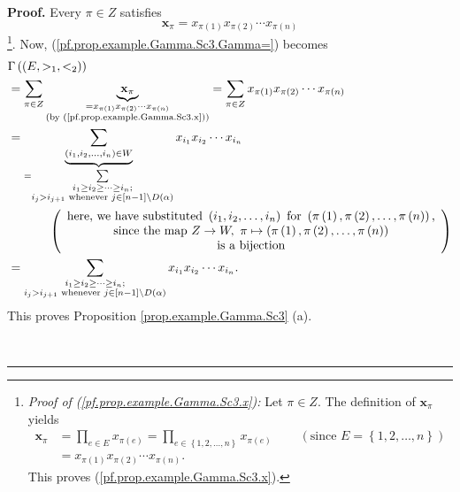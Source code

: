 \documentclass[numbers=enddot,12pt,final,onecolumn,notitlepage,abstracton]{scrartcl}
\theoremstyle{definition}
\newenvironment{proof}[1][Proof]{\noindent\textbf{#1.} }{\ \rule{0.5em}{0.5em}}
\let\sumnonlimits\sum
\let\prodnonlimits\prod
\renewcommand{\sum}{\sumnonlimits\limits}
\renewcommand{\prod}{\prodnonlimits\limits}
\newenvironment{verlong}{}{}
\begin{document}
\begin{verlong}
\begin{footnotesize}
\begin{proof}
Every $\pi\in Z$ satisfies%
\begin{equation}
\mathbf{x}_{\pi}=x_{\pi\left(  1\right)  }x_{\pi\left(  2\right)  }\cdots
x_{\pi\left(  n\right)  } \label{pf.prop.example.Gamma.Sc3.x}%
\end{equation}
\footnote{\textit{Proof of (\ref{pf.prop.example.Gamma.Sc3.x}):} Let $\pi\in
Z$. The definition of $\mathbf{x}_{\pi}$ yields%
\begin{align*}
{\mathbf{x}}_{\pi}  &  =\prod_{e\in E}x_{\pi\left(  e\right)  }=\prod
_{e\in\left\{  1,2,\ldots,n\right\}  }x_{\pi\left(  e\right)  }%
\ \ \ \ \ \ \ \ \ \ \left(  \text{since }E=\left\{  1,2,\ldots,n\right\}
\right) \\
&  =x_{\pi\left(  1\right)  }x_{\pi\left(  2\right)  }\cdots x_{\pi\left(
n\right)  }.
\end{align*}
This proves (\ref{pf.prop.example.Gamma.Sc3.x}).}. Now,
(\ref{pf.prop.example.Gamma.Sc3.Gamma=}) becomes%
\begin{align*}
&  \Gamma\left(  \left(  E,>_{1},<_{2}\right)  \right) \\
&  =\sum_{\pi\in Z}\underbrace{\mathbf{x}_{\pi}}_{\substack{=x_{\pi\left(
1\right)  }x_{\pi\left(  2\right)  }\cdots x_{\pi\left(  n\right)
}\\\text{(by (\ref{pf.prop.example.Gamma.Sc3.x}))}}}=\sum_{\pi\in Z}%
x_{\pi\left(  1\right)  }x_{\pi\left(  2\right)  }\cdots x_{\pi\left(
n\right)  }\\
&  =\underbrace{\sum_{\left(  i_{1},i_{2},\ldots,i_{n}\right)  \in W}}%
_{=\sum_{\substack{i_{1}\geq i_{2}\geq\cdots\geq i_{n};\\i_{j}>i_{j+1}\text{
whenever }j\in\left[  n-1\right]  \setminus D\left(  \alpha\right)  }%
}}x_{i_{1}}x_{i_{2}}\cdots x_{i_{n}}\\
&  \ \ \ \ \ \ \ \ \ \ \left(
\begin{array}
[c]{c}%
\text{here, we have substituted }\left(  i_{1},i_{2},\ldots,i_{n}\right)
\text{ for }\left(  \pi\left(  1\right)  ,\pi\left(  2\right)  ,\ldots
,\pi\left(  n\right)  \right)  \text{,}\\
\text{since the map }Z\rightarrow W,\ \pi\mapsto\left(  \pi\left(  1\right)
,\pi\left(  2\right)  ,\ldots,\pi\left(  n\right)  \right) \\
\text{is a bijection}%
\end{array}
\right) \\
&  =\sum_{\substack{i_{1}\geq i_{2}\geq\cdots\geq i_{n};\\i_{j}>i_{j+1}\text{
whenever }j\in\left[  n-1\right]  \setminus D\left(  \alpha\right)  }%
}x_{i_{1}}x_{i_{2}}\cdots x_{i_{n}}.
\end{align*}
This proves Proposition \ref{prop.example.Gamma.Sc3} (a).


\end{proof}
\end{footnotesize}
\end{verlong}
\end{document}
